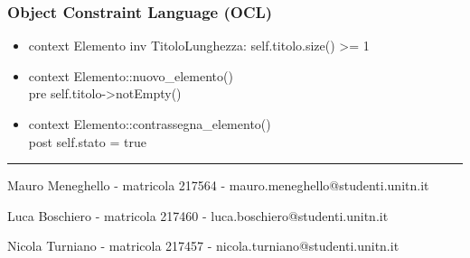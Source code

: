 \documentclass[a4paper,12pt]{article}
\begin{document}
\subsubsection*{Object Constraint Language (OCL)}
\begin{itemize}
\item {\ttfamily context Elemento inv TitoloLunghezza: self.titolo.size() >= 1}
\item {\ttfamily context Elemento::nuovo\_elemento() \\pre self.titolo->notEmpty() }
\item {\ttfamily context Elemento::contrassegna\_elemento() \\post self.stato = true }

\end{itemize}



\vspace{15cm}
\hrule
\vspace{0.5cm}


Mauro Meneghello - matricola 217564 - mauro.meneghello@studenti.unitn.it

Luca Boschiero - matricola 217460 -  luca.boschiero@studenti.unitn.it

Nicola Turniano - matricola 217457 - nicola.turniano@studenti.unitn.it

 
\end{document}
